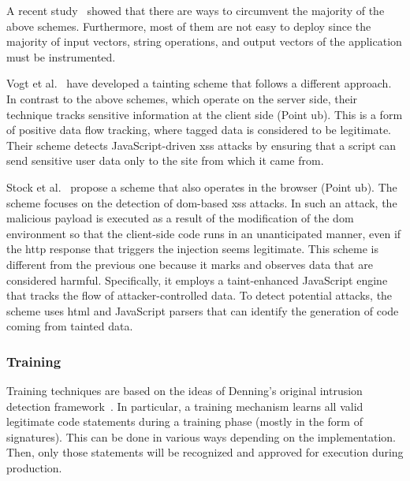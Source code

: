 \documentclass[conference]{IEEEtran}
\begin{document}
A recent study~\cite{NBR14} showed that there are ways to circumvent
the majority of the above schemes. Furthermore, most of them are not
easy to deploy since the majority of input vectors, string operations,
and output vectors of the application must be instrumented.

Vogt et al.~\cite{VFJKKV07} have developed a tainting scheme
that follows a different approach. In contrast to the above
schemes, which operate on the server side, their technique tracks sensitive
information at the client side (Point {\sc ub}). This is a form of
positive data flow tracking, where tagged data is considered to be
legitimate. Their scheme detects JavaScript-driven {\sc xss} attacks
by ensuring that a script can send sensitive user data only to the
site from which it came from.

Stock et al.~\cite{SLMS14} propose a scheme that also operates
in the browser (Point {\sc ub}). The scheme focuses on the detection of
{\sc dom}-based {\sc xss} attacks. In such an attack, the malicious
payload is executed as a result of the modification of the {\sc dom}
environment so that the client-side code runs in an unanticipated
manner, even if the {\sc http} response that triggers the injection
seems legitimate. This scheme is different from the previous one
because it marks and observes data that are considered harmful.
Specifically, it employs a taint-enhanced JavaScript engine that
tracks the flow of attacker-controlled data. To detect potential
attacks, the scheme uses {\sc html} and JavaScript parsers that can
identify the generation of code coming from tainted data.

\subsubsection{Training}
\label{sec:train}

Training techniques are based on the ideas of Denning's original
intrusion detection framework~\cite{Den87}. In particular, a training
mechanism learns all valid legitimate code statements during a
training phase (mostly in the form of signatures). This can be done in
various ways depending on the implementation. Then, only those
statements will be recognized and approved for execution during
production.
\end{document}
